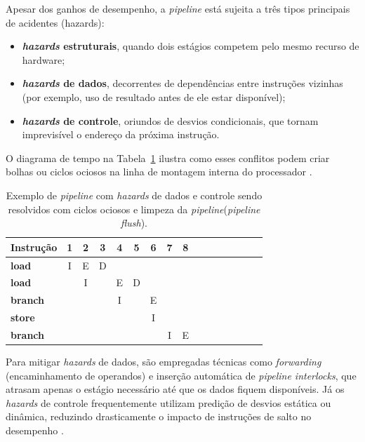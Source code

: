 \documentclass[
	12pt,				%
	openright,			%
	oneside,			%
	a4paper,			%
	english,			%
	french,				%
	spanish,			%
	brazil,				%
	]{abntex2}
\begin{document}
Apesar dos ganhos de desempenho, a \textit{pipeline} está sujeita a três tipos principais de acidentes (hazards):
\begin{itemize}
  \item \textbf{\textit{hazards} estruturais}, quando dois estágios competem pelo mesmo recurso de hardware;
  \item \textbf{\textit{hazards} de dados}, decorrentes de dependências entre instruções vizinhas (por exemplo, uso de resultado antes de ele estar disponível);
  \item \textbf{\textit{hazards} de controle}, oriundos de desvios condicionais, que tornam imprevisível o endereço da próxima instrução.
\end{itemize}

O diagrama de tempo na Tabela~\ref{tab:pipeline_hazards} ilustra como esses conflitos podem criar bolhas ou ciclos ociosos na linha de montagem interna do processador \cite[p.47-51]{stallings_reduced_1988}.

\begin{table}[h]
  \centering
  \begin{tabular}{l *{15}{c}}
    \toprule
    \textbf{Instrução}
      & \textbf{1} & \textbf{2} & \textbf{3} & \textbf{4}
      & \textbf{5} & \textbf{6} & \textbf{7} & \textbf{8} \\
    \midrule
    \textbf{load}   & I & E & D &   &   &   &   &   \\
    \textbf{load}   &   & I &   & E & D &   &   &   \\
    \textbf{branch} &   &   &   & I &   & E &   &   \\
    \textbf{store}  &   &   &   &   &   & I &   &   \\
    \textbf{branch} &   &   &   &   &   &   & I & E \\
    \bottomrule
  \end{tabular}
    \caption{Exemplo de \textit{pipeline} com \textit{hazards} de dados e controle sendo resolvidos com ciclos ociosos e limpeza da \textit{pipeline}(\textit{pipeline flush})\cite[p.50]{stallings_reduced_1988}.} \label{tab:pipeline_hazards}
\end{table}


Para mitigar \textit{hazards} de dados, são empregadas técnicas como \textit{forwarding} (encaminhamento de operandos) e inserção automática de \textit{pipeline interlocks}, que atrasam apenas o estágio necessário até que os dados fiquem disponíveis. Já os \textit{hazards} de controle frequentemente utilizam predição de desvios estática ou dinâmica, reduzindo drasticamente o impacto de instruções de salto no desempenho \cite[p.47-51]{stallings_reduced_1988}.
\end{document}
